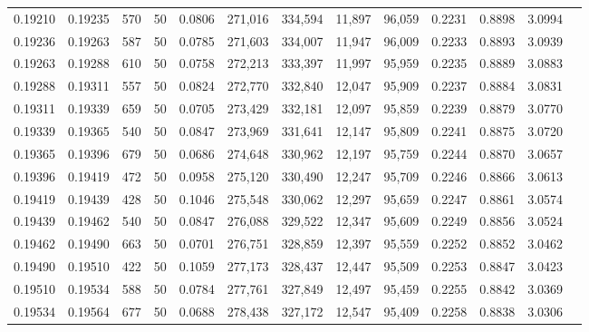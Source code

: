 \begin{tabular}{rrrrrrrrrrrrr}
0.19210 & 0.19235 &   570 &  50 &                                     0.0806 & 271,016 & 334,594 &  11,897 &  96,059 & 0.2231 & 0.8898 & 3.0994 \\
0.19236 & 0.19263 &   587 &  50 &                                     0.0785 & 271,603 & 334,007 &  11,947 &  96,009 & 0.2233 & 0.8893 & 3.0939 \\
0.19263 & 0.19288 &   610 &  50 &                                     0.0758 & 272,213 & 333,397 &  11,997 &  95,959 & 0.2235 & 0.8889 & 3.0883 \\
0.19288 & 0.19311 &   557 &  50 &                                     0.0824 & 272,770 & 332,840 &  12,047 &  95,909 & 0.2237 & 0.8884 & 3.0831 \\
0.19311 & 0.19339 &   659 &  50 &                                     0.0705 & 273,429 & 332,181 &  12,097 &  95,859 & 0.2239 & 0.8879 & 3.0770 \\
0.19339 & 0.19365 &   540 &  50 &                                     0.0847 & 273,969 & 331,641 &  12,147 &  95,809 & 0.2241 & 0.8875 & 3.0720 \\
0.19365 & 0.19396 &   679 &  50 &                                     0.0686 & 274,648 & 330,962 &  12,197 &  95,759 & 0.2244 & 0.8870 & 3.0657 \\
0.19396 & 0.19419 &   472 &  50 &                                     0.0958 & 275,120 & 330,490 &  12,247 &  95,709 & 0.2246 & 0.8866 & 3.0613 \\
0.19419 & 0.19439 &   428 &  50 &                                     0.1046 & 275,548 & 330,062 &  12,297 &  95,659 & 0.2247 & 0.8861 & 3.0574 \\
0.19439 & 0.19462 &   540 &  50 &                                     0.0847 & 276,088 & 329,522 &  12,347 &  95,609 & 0.2249 & 0.8856 & 3.0524 \\
0.19462 & 0.19490 &   663 &  50 &                                     0.0701 & 276,751 & 328,859 &  12,397 &  95,559 & 0.2252 & 0.8852 & 3.0462 \\
0.19490 & 0.19510 &   422 &  50 &                                     0.1059 & 277,173 & 328,437 &  12,447 &  95,509 & 0.2253 & 0.8847 & 3.0423 \\
0.19510 & 0.19534 &   588 &  50 &                                     0.0784 & 277,761 & 327,849 &  12,497 &  95,459 & 0.2255 & 0.8842 & 3.0369 \\
0.19534 & 0.19564 &   677 &  50 &                                     0.0688 & 278,438 & 327,172 &  12,547 &  95,409 & 0.2258 & 0.8838 & 3.0306 \\

\end{tabular}
